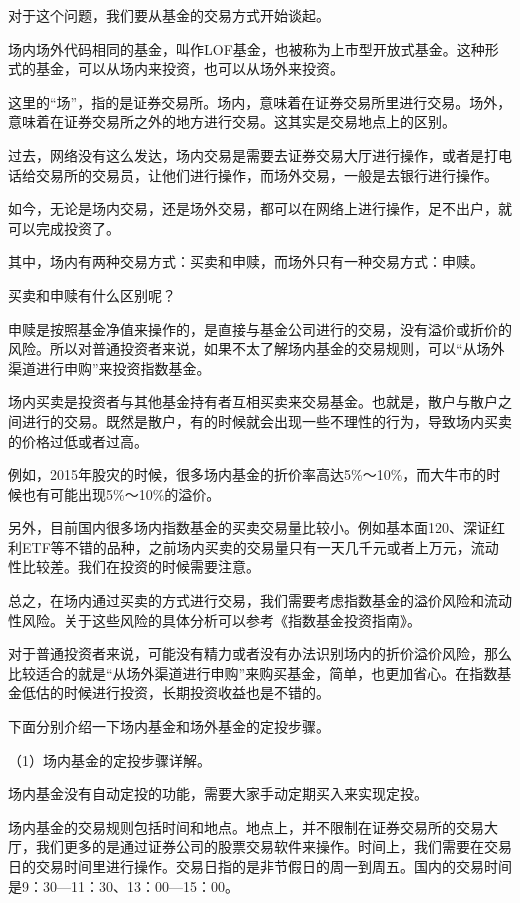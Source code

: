 对于这个问题，我们要从基金的交易方式开始谈起。

场内场外代码相同的基金，叫作LOF基金，也被称为上市型开放式基金。这种形式的基金，可以从场内来投资，也可以从场外来投资。

这里的“场”，指的是证券交易所。场内，意味着在证券交易所里进行交易。场外，意味着在证券交易所之外的地方进行交易。这其实是交易地点上的区别。

过去，网络没有这么发达，场内交易是需要去证券交易大厅进行操作，或者是打电话给交易所的交易员，让他们进行操作，而场外交易，一般是去银行进行操作。

如今，无论是场内交易，还是场外交易，都可以在网络上进行操作，足不出户，就可以完成投资了。

其中，场内有两种交易方式：买卖和申赎，而场外只有一种交易方式：申赎。

买卖和申赎有什么区别呢？

申赎是按照基金净值来操作的，是直接与基金公司进行的交易，没有溢价或折价的风险。所以对普通投资者来说，如果不太了解场内基金的交易规则，可以“从场外渠道进行申购”来投资指数基金。

场内买卖是投资者与其他基金持有者互相买卖来交易基金。也就是，散户与散户之间进行的交易。既然是散户，有的时候就会出现一些不理性的行为，导致场内买卖的价格过低或者过高。

例如，2015年股灾的时候，很多场内基金的折价率高达5\%～10\%，而大牛市的时候也有可能出现5\%～10\%的溢价。

另外，目前国内很多场内指数基金的买卖交易量比较小。例如基本面120、深证红利ETF等不错的品种，之前场内买卖的交易量只有一天几千元或者上万元，流动性比较差。我们在投资的时候需要注意。

总之，在场内通过买卖的方式进行交易，我们需要考虑指数基金的溢价风险和流动性风险。关于这些风险的具体分析可以参考《指数基金投资指南》。

对于普通投资者来说，可能没有精力或者没有办法识别场内的折价溢价风险，那么比较适合的就是“从场外渠道进行申购”来购买基金，简单，也更加省心。在指数基金低估的时候进行投资，长期投资收益也是不错的。

下面分别介绍一下场内基金和场外基金的定投步骤。

（1）场内基金的定投步骤详解。

场内基金没有自动定投的功能，需要大家手动定期买入来实现定投。

场内基金的交易规则包括时间和地点。地点上，并不限制在证券交易所的交易大厅，我们更多的是通过证券公司的股票交易软件来操作。时间上，我们需要在交易日的交易时间里进行操作。交易日指的是非节假日的周一到周五。国内的交易时间是9：30—11：30、13：00—15：00。

